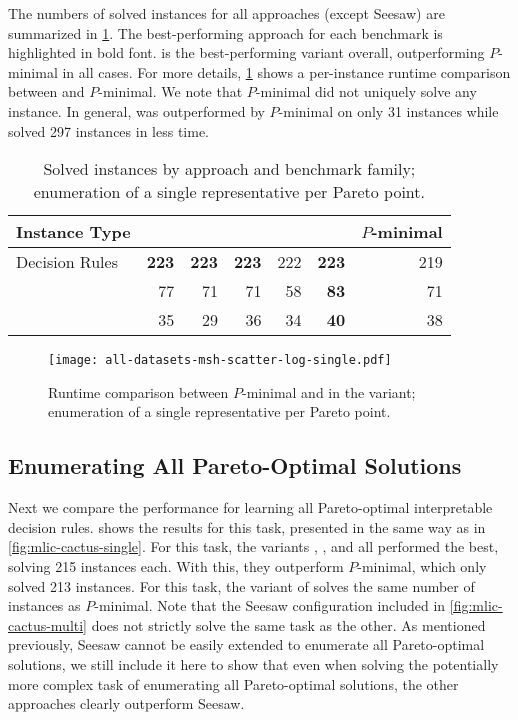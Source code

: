 The numbers of solved instances for all approaches (except Seesaw) are summarized in \cref{tab:nsolved-single}.
The best-performing approach for each benchmark is highlighted in bold font.
\msh{} is the best-performing \algname{} variant overall, outperforming $P$-minimal in all cases.
For more details, \cref{fig:msh-scatter-single} shows a per-instance runtime comparison between \msh{} and $P$-minimal.
We note that $P$-minimal did not uniquely solve any instance.
In general, \msh{} was outperformed by $P$-minimal on only 31 instances while \msh{} solved 297 instances in less time.

\begin{table}
  \centering
  \caption{Solved instances by approach and benchmark family;
    enumeration of a single representative per Pareto point.
  }\label{tab:nsolved-single}
  \begin{tabular}{@{}lrrrrrr@{}}
    \toprule
    Instance Type & \satunsat{} & \unsatsat{} & \msu{} & \oll{} & \msh{} & $P$-minimal \\
    \midrule
    Decision Rules & \textbf{223} & \textbf{223} & \textbf{223} & 222 & \textbf{223} & 219 \\
    \scep{} & 77 & 71 & 71 & 58 & \textbf{83} & 71 \\
    \scsc{} & 35 & 29 & 36 & 34 & \textbf{40} & 38 \\
    \bottomrule
  \end{tabular}
\end{table}

\begin{figure}
  \centering
  \texttt{[image: all-datasets-msh-scatter-log-single.pdf]}
  \caption{Runtime comparison between $P$-minimal and \algname{} in the \msh{} variant;
    enumeration of a single representative per Pareto point.
  }\label{fig:msh-scatter-single}
\end{figure}


\subsection{Enumerating All Pareto-Optimal Solutions}

Next we compare the performance for learning all Pareto-optimal interpretable decision rules.
 shows the results for this task, presented in the same way as in \cref{fig:mlic-cactus-single}.
For this task, the \algname{} variants \satunsat{}, \unsatsat{}, \msu{} and \msh{} all performed the best, solving 215 instances each.
With this, they outperform $P$-minimal, which only solved 213 instances.
For this task, the \oll{} variant of \algname{} solves the same number of instances as $P$-minimal.
Note that the Seesaw configuration included in \cref{fig:mlic-cactus-multi} does not strictly solve the same task as the other.
As mentioned previously, Seesaw cannot be easily extended to enumerate all Pareto-optimal solutions, we still include it here to show that even when solving the potentially more complex task of enumerating all Pareto-optimal solutions, the other approaches clearly outperform Seesaw.

